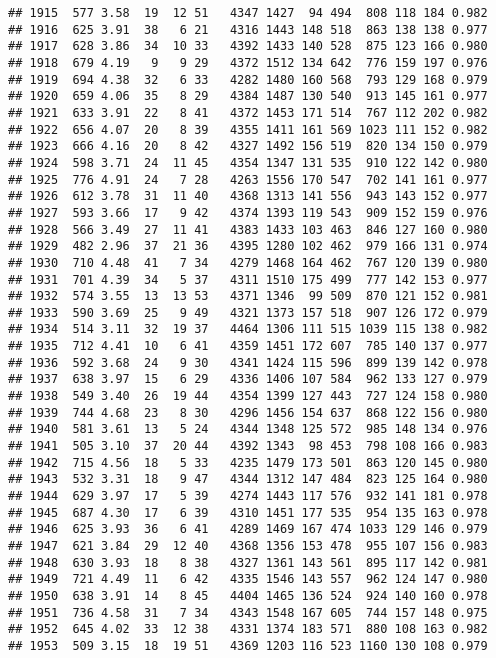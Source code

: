 \documentclass[]{article}
\begin{document}
\begin{verbatim}
## 1915  577 3.58  19  12 51   4347 1427  94 494  808 118 184 0.982
## 1916  625 3.91  38   6 21   4316 1443 148 518  863 138 138 0.977
## 1917  628 3.86  34  10 33   4392 1433 140 528  875 123 166 0.980
## 1918  679 4.19   9   9 29   4372 1512 134 642  776 159 197 0.976
## 1919  694 4.38  32   6 33   4282 1480 160 568  793 129 168 0.979
## 1920  659 4.06  35   8 29   4384 1487 130 540  913 145 161 0.977
## 1921  633 3.91  22   8 41   4372 1453 171 514  767 112 202 0.982
## 1922  656 4.07  20   8 39   4355 1411 161 569 1023 111 152 0.982
## 1923  666 4.16  20   8 42   4327 1492 156 519  820 134 150 0.979
## 1924  598 3.71  24  11 45   4354 1347 131 535  910 122 142 0.980
## 1925  776 4.91  24   7 28   4263 1556 170 547  702 141 161 0.977
## 1926  612 3.78  31  11 40   4368 1313 141 556  943 143 152 0.977
## 1927  593 3.66  17   9 42   4374 1393 119 543  909 152 159 0.976
## 1928  566 3.49  27  11 41   4383 1433 103 463  846 127 160 0.980
## 1929  482 2.96  37  21 36   4395 1280 102 462  979 166 131 0.974
## 1930  710 4.48  41   7 34   4279 1468 164 462  767 120 139 0.980
## 1931  701 4.39  34   5 37   4311 1510 175 499  777 142 153 0.977
## 1932  574 3.55  13  13 53   4371 1346  99 509  870 121 152 0.981
## 1933  590 3.69  25   9 49   4321 1373 157 518  907 126 172 0.979
## 1934  514 3.11  32  19 37   4464 1306 111 515 1039 115 138 0.982
## 1935  712 4.41  10   6 41   4359 1451 172 607  785 140 137 0.977
## 1936  592 3.68  24   9 30   4341 1424 115 596  899 139 142 0.978
## 1937  638 3.97  15   6 29   4336 1406 107 584  962 133 127 0.979
## 1938  549 3.40  26  19 44   4354 1399 127 443  727 124 158 0.980
## 1939  744 4.68  23   8 30   4296 1456 154 637  868 122 156 0.980
## 1940  581 3.61  13   5 24   4344 1348 125 572  985 148 134 0.976
## 1941  505 3.10  37  20 44   4392 1343  98 453  798 108 166 0.983
## 1942  715 4.56  18   5 33   4235 1479 173 501  863 120 145 0.980
## 1943  532 3.31  18   9 47   4344 1312 147 484  823 125 164 0.980
## 1944  629 3.97  17   5 39   4274 1443 117 576  932 141 181 0.978
## 1945  687 4.30  17   6 39   4310 1451 177 535  954 135 163 0.978
## 1946  625 3.93  36   6 41   4289 1469 167 474 1033 129 146 0.979
## 1947  621 3.84  29  12 40   4368 1356 153 478  955 107 156 0.983
## 1948  630 3.93  18   8 38   4327 1361 143 561  895 117 142 0.981
## 1949  721 4.49  11   6 42   4335 1546 143 557  962 124 147 0.980
## 1950  638 3.91  14   8 45   4404 1465 136 524  924 140 160 0.978
## 1951  736 4.58  31   7 34   4343 1548 167 605  744 157 148 0.975
## 1952  645 4.02  33  12 38   4331 1374 183 571  880 108 163 0.982
## 1953  509 3.15  18  19 51   4369 1203 116 523 1160 130 108 0.979

\end{verbatim}
\end{document}
